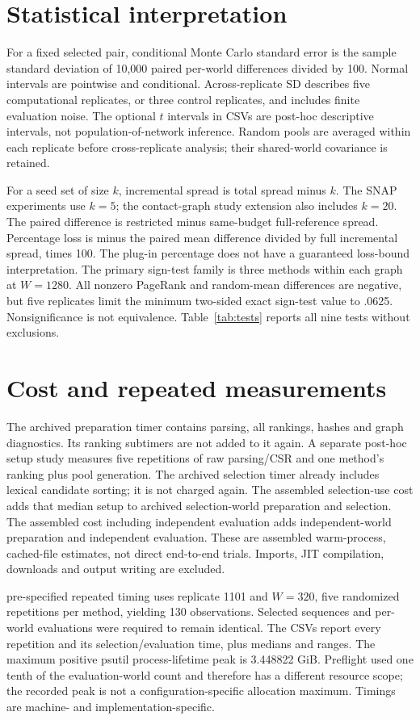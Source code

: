 \documentclass[smallextended]{svjour3}
\begin{document}
\section{Statistical interpretation}
For a fixed selected pair, conditional Monte Carlo standard error is the sample
standard deviation of 10,000 paired per-world differences divided by 100.
Normal intervals are pointwise and conditional. Across-replicate SD describes five
computational replicates, or three control replicates, and includes finite evaluation noise.
The optional $t$ intervals in CSVs are post-hoc descriptive intervals, not
population-of-network inference. Random pools are averaged within each replicate
before cross-replicate analysis; their shared-world covariance is retained.

For a seed set of size $k$, incremental spread is total spread minus $k$.
The SNAP experiments use $k=5$; the contact-graph study extension also includes $k=20$.
The paired difference is restricted minus same-budget full-reference spread. Percentage loss is
minus the paired mean difference divided by full incremental spread, times 100.
The plug-in percentage does not have a guaranteed loss-bound interpretation.
The primary sign-test family is three methods within each graph at $W=1280$.
All nonzero PageRank and random-mean differences are negative, but five replicates
limit the minimum two-sided exact sign-test value to .0625. Nonsignificance is
not equivalence. Table~\ref{tab:tests} reports all nine tests without exclusions.

\section{Cost and repeated measurements}
The archived preparation timer contains parsing, all rankings, hashes and graph
diagnostics. Its ranking subtimers are not added to it again. A separate
post-hoc setup study measures five repetitions of raw parsing/CSR and one
method's ranking plus pool generation. The archived selection timer already includes
lexical candidate sorting; it is not charged again. The assembled selection-use cost adds that
median setup to archived selection-world preparation and selection. The assembled cost including independent evaluation adds independent-world preparation and independent evaluation.
These are assembled warm-process, cached-file estimates, not direct end-to-end
trials. Imports, JIT compilation, downloads and output writing are excluded.

pre-specified repeated timing uses replicate 1101 and $W=320$, five randomized repetitions
per method, yielding 130 observations. Selected sequences and per-world evaluations
were required to remain identical. The CSVs report every repetition and its
selection/evaluation time, plus medians and ranges. The maximum positive psutil process-lifetime peak is 3.448822 GiB. Preflight
used one tenth of the evaluation-world count and therefore has a different
resource scope; the recorded peak is not a configuration-specific allocation maximum. Timings are machine- and implementation-specific.
\end{document}
